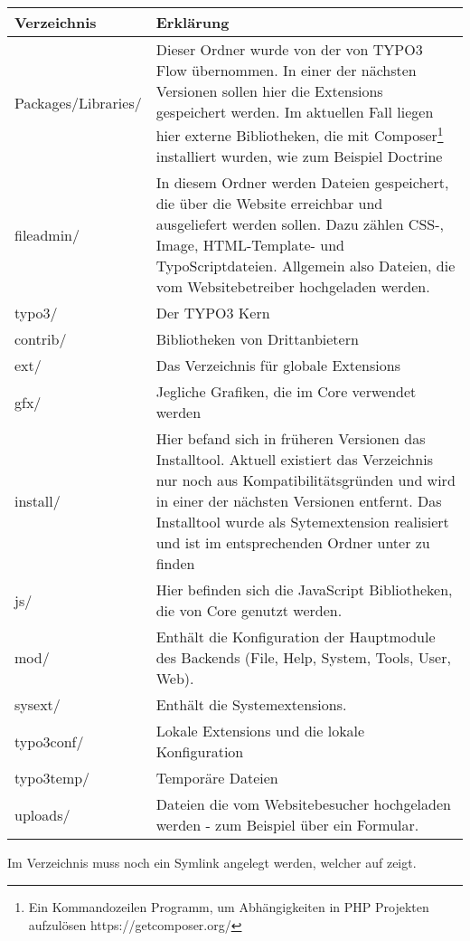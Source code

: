 \begin{tabularx}{\textwidth}{|X|X|}
	\hline
	Verzeichnis & Erklärung\\
	\hline
	Packages/Libraries/ & Dieser Ordner wurde von der von TYPO3 Flow übernommen. In einer der nächsten Versionen sollen hier die Extensions gespeichert werden. Im aktuellen Fall liegen hier externe Bibliotheken, die mit Composer\footnote{Ein Kommandozeilen Programm, um Abhängigkeiten in PHP Projekten aufzulösen https://getcomposer.org/} installiert wurden, wie zum Beispiel Doctrine\\
	\hline
	fileadmin/ & In diesem Ordner werden Dateien gespeichert, die über die Website erreichbar und ausgeliefert werden sollen. Dazu zählen CSS-, Image, HTML-Template- und TypoScriptdateien. Allgemein also Dateien, die vom Websitebetreiber hochgeladen werden.\\
	\hline
	typo3/ & Der TYPO3 Kern\\
	\hline
	contrib/ & Bibliotheken von Drittanbietern\\
	\hline
	  ext/ & Das Verzeichnis für globale Extensions \\
	\hline
	  gfx/ & Jegliche Grafiken, die im Core verwendet werden \\
	\hline
	  install/ & Hier befand sich in früheren Versionen das Installtool. Aktuell existiert das Verzeichnis nur noch aus Kompatibilitätsgründen und wird in einer der nächsten Versionen entfernt. Das Installtool wurde als Sytemextension realisiert und ist im entsprechenden Ordner unter \pdf{sysext/install/} zu finden\\
	\hline
	  js/ & Hier befinden sich die JavaScript Bibliotheken, die von Core genutzt werden.\\
	\hline
	  mod/ & Enthält die Konfiguration der Hauptmodule des Backends (File, Help, System, Tools, User, Web).\\
	\hline
	  sysext/ & Enthält die Systemextensions.\\
	\hline
	typo3conf/ & Lokale Extensions und die lokale Konfiguration\\
	\hline
	typo3temp/ & Temporäre Dateien\\
	\hline
	uploads/ & Dateien die vom Websitebesucher hochgeladen werden - zum Beispiel über ein Formular.\\
	\hline
\end{tabularx}

Im Verzeichnis  muss noch ein Symlink  angelegt werden, welcher auf  zeigt.

